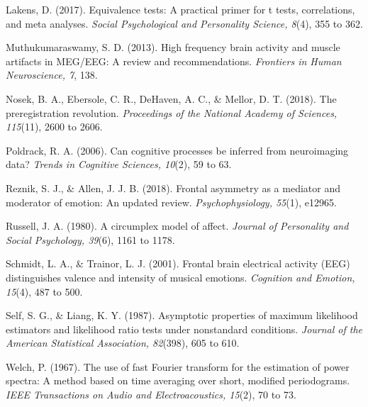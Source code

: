 \documentclass[11pt,a4paper]{article}
\begin{document}
Lakens, D. (2017). Equivalence tests: A practical primer for t tests, correlations, and meta analyses. \emph{Social Psychological and Personality Science, 8}(4), 355 to 362.

Muthukumaraswamy, S. D. (2013). High frequency brain activity and muscle artifacts in MEG/EEG: A review and recommendations. \emph{Frontiers in Human Neuroscience, 7}, 138.

Nosek, B. A., Ebersole, C. R., DeHaven, A. C., \& Mellor, D. T. (2018). The preregistration revolution. \emph{Proceedings of the National Academy of Sciences, 115}(11), 2600 to 2606.

Poldrack, R. A. (2006). Can cognitive processes be inferred from neuroimaging data? \emph{Trends in Cognitive Sciences, 10}(2), 59 to 63.

Reznik, S. J., \& Allen, J. J. B. (2018). Frontal asymmetry as a mediator and moderator of emotion: An updated review. \emph{Psychophysiology, 55}(1), e12965.

Russell, J. A. (1980). A circumplex model of affect. \emph{Journal of Personality and Social Psychology, 39}(6), 1161 to 1178.

Schmidt, L. A., \& Trainor, L. J. (2001). Frontal brain electrical activity (EEG) distinguishes valence and intensity of musical emotions. \emph{Cognition and Emotion, 15}(4), 487 to 500.

Self, S. G., \& Liang, K. Y. (1987). Asymptotic properties of maximum likelihood estimators and likelihood ratio tests under nonstandard conditions. \emph{Journal of the American Statistical Association, 82}(398), 605 to 610.

Welch, P. (1967). The use of fast Fourier transform for the estimation of power spectra: A method based on time averaging over short, modified periodograms. \emph{IEEE Transactions on Audio and Electroacoustics, 15}(2), 70 to 73.
\end{document}
